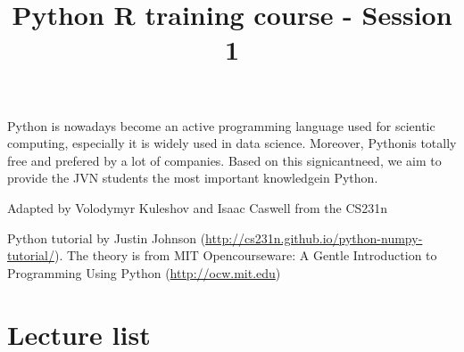 \documentclass[11pt]{article}
\title{Python R training course - Session 1}
\begin{document}
    
    
    \maketitle
    
    

    
    Python is nowadays become an active programming language used for
scientic computing, especially it is widely used in data science.
Moreover, Pythonis totally free and prefered by a lot of companies.
Based on this signicantneed, we aim to provide the JVN students the most
important knowledgein Python.

Adapted by Volodymyr Kuleshov and Isaac Caswell from the CS231n

Python tutorial by Justin Johnson
(\url{http://cs231n.github.io/python-numpy-tutorial/}). The theory is
from MIT Opencourseware: A Gentle Introduction to Programming Using
Python
(\href{http://ocw.mit.edu/courses/electrical-engineering-and-computer-science/6-189-a-gentle-introduction-to-programming-using-python-january-iap-2011/readings/}{http://ocw.mit.edu})

\section{Lecture list}\label{lecture-list}
\end{document}
